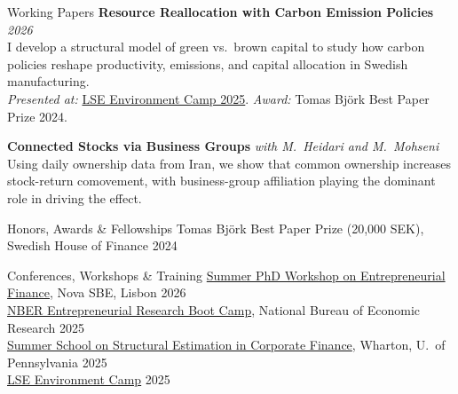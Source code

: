 \documentclass{resume}
\begin{document}
\begin{rSection}{Working Papers}
  \vspace{2pt}
  {\bf Resource Reallocation with Carbon Emission Policies} \hfill {\em 2026} \\[-2pt]
  {\small I develop a structural model of green vs.\ brown capital to study how carbon policies reshape productivity, emissions, and capital allocation in Swedish manufacturing.} \\[2pt]
  {\small {\em Presented at:} \href{https://www.lse-environment-week.com/environment-camp-2025}{LSE Environment Camp 2025}. \hspace{1ex} {\em Award:} Tomas Bj\"{o}rk Best Paper Prize 2024.}
  \vspace{6pt}

  {\bf Connected Stocks via Business Groups} \hfill {\em with M.\ Heidari and M.\ Mohseni} \\[-2pt]
  {\small Using daily ownership data from Iran, we show that common ownership increases stock-return comovement, with business-group affiliation playing the dominant role in driving the effect.}
\end{rSection}

\begin{rSection}{Honors, Awards \& Fellowships}
  \vspace{-2pt}
  Tomas Bj\"{o}rk Best Paper Prize (20,000 SEK), Swedish House of Finance \hfill {2024}
\end{rSection}

\begin{rSection}{Conferences, Workshops \& Training}
  \vspace{-2pt}
  \href{https://entrepreneurial.finance/summer-phd-workshop/}{Summer PhD Workshop on Entrepreneurial Finance}, Nova SBE, Lisbon \hfill {2026} \\
  \href{https://www.nber.org/conferences/entrepreneurship-research-boot-camp-summer-2025}{NBER Entrepreneurial Research Boot Camp}, National Bureau of Economic Research \hfill {2025} \\
  \href{https://rodneywhitecenter.wharton.upenn.edu/2025-summer-school/}{Summer School on Structural Estimation in Corporate Finance}, Wharton, U.\ of Pennsylvania \hfill {2025} \\
  \href{https://www.lse-environment-week.com/environment-camp-2025}{LSE Environment Camp} \hfill {2025}
\end{rSection}
\end{document}
